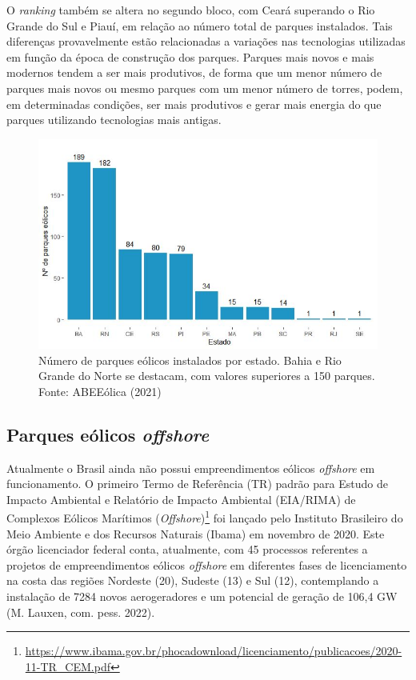 \documentclass[
  oneside]{scrbook}
\DeclareRobustCommand{\href}[2]{#2\footnote{\url{#1}}}
\begin{document}
O \emph{ranking} também se altera no segundo bloco, com Ceará superando o Rio Grande do Sul e Piauí, em relação ao número total de parques instalados. Tais diferenças provavelmente estão relacionadas a variações nas tecnologias utilizadas em função da época de construção dos parques. Parques mais novos e mais modernos tendem a ser mais produtivos, de forma que um menor número de parques mais novos ou mesmo parques com um menor número de torres, podem, em determinadas condições, ser mais produtivos e gerar mais energia do que parques utilizando tecnologias mais antigas.

\begin{figure}[H]

{\centering \includegraphics[width=0.8\linewidth]{imagens/cap01/Figura_1.6_1} 

}

\caption{Número de parques eólicos instalados por estado. Bahia e Rio Grande do Norte se destacam, com valores superiores a 150 parques. Fonte: ABEEólica (2021)}\label{fig:06}
\end{figure}

\hypertarget{parques-euxf3licos-offshore}{%
\subsection{\texorpdfstring{Parques eólicos \emph{offshore}}{Parques eólicos offshore}}\label{parques-euxf3licos-offshore}}

Atualmente o Brasil ainda não possui empreendimentos eólicos \emph{offshore} em funcionamento. O primeiro \href{https://www.ibama.gov.br/phocadownload/licenciamento/publicacoes/2020-11-TR_CEM.pdf}{Termo de Referência (TR) padrão para Estudo de Impacto Ambiental e Relatório de Impacto Ambiental (EIA/RIMA) de Complexos Eólicos Marítimos (\emph{Offshore})} foi lançado pelo Instituto Brasileiro do Meio Ambiente e dos Recursos Naturais (Ibama) em novembro de 2020. Este órgão licenciador federal conta, atualmente, com 45 processos referentes a projetos de empreendimentos eólicos \emph{offshore} em diferentes fases de licenciamento na costa das regiões Nordeste (20), Sudeste (13) e Sul (12), contemplando a instalação de 7284 novos aerogeradores e um potencial de geração de 106,4 GW (M. Lauxen, com. pess. 2022).
\end{document}
